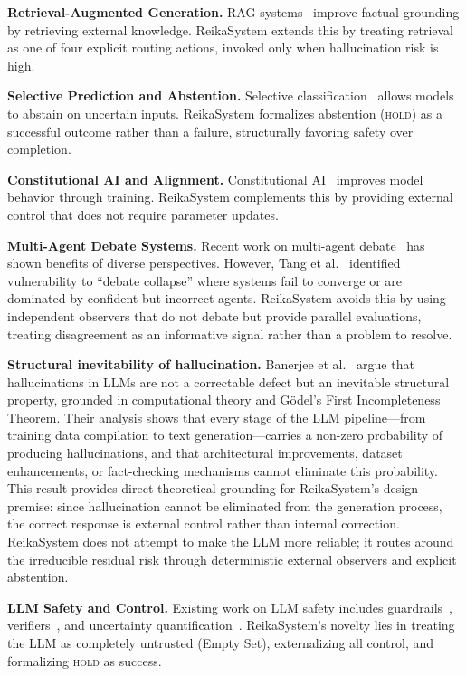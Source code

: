 \documentclass[11pt,a4paper]{article}
\begin{document}
\textbf{Retrieval-Augmented Generation.} RAG systems~\cite{lewis2020rag} improve factual
grounding by retrieving external knowledge. ReikaSystem extends this by treating retrieval as
one of four explicit routing actions, invoked only when hallucination risk is high.

\textbf{Selective Prediction and Abstention.} Selective classification~\cite{geifman2017selective}
allows models to abstain on uncertain inputs. ReikaSystem formalizes abstention (\textsc{hold})
as a successful outcome rather than a failure, structurally favoring safety over completion.

\textbf{Constitutional AI and Alignment.} Constitutional AI~\cite{bai2022constitutional}
improves model behavior through training. ReikaSystem complements this by providing external
control that does not require parameter updates.

\textbf{Multi-Agent Debate Systems.} Recent work on multi-agent
debate~\cite{du2023improving} has shown benefits of diverse perspectives. However,
Tang et al.~\cite{tang2024variance} identified vulnerability to ``debate collapse'' where
systems fail to converge or are dominated by confident but incorrect agents. ReikaSystem
avoids this by using independent observers that do not debate but provide parallel
evaluations, treating disagreement as an informative signal rather than a problem to resolve.

\textbf{Structural inevitability of hallucination.}
Banerjee et al.~\cite{banerjee2024hallucinate} argue that hallucinations in LLMs
are not a correctable defect but an inevitable structural property, grounded in
computational theory and G\"{o}del's First Incompleteness Theorem.
Their analysis shows that every stage of the LLM pipeline---from training data
compilation to text generation---carries a non-zero probability of producing
hallucinations, and that architectural improvements, dataset enhancements, or
fact-checking mechanisms cannot eliminate this probability.
This result provides direct theoretical grounding for ReikaSystem's design
premise: since hallucination cannot be eliminated from the generation process,
the correct response is external control rather than internal correction.
ReikaSystem does not attempt to make the LLM more reliable; it routes around
the irreducible residual risk through deterministic external observers and
explicit abstention.

\textbf{LLM Safety and Control.} Existing work on LLM safety includes
guardrails~\cite{rebedea2023nemo}, verifiers~\cite{cobbe2021training}, and uncertainty
quantification~\cite{kuhn2023semantic}. ReikaSystem's novelty lies in treating the LLM as
completely untrusted (Empty Set), externalizing all control, and formalizing \textsc{hold}
as success.
\end{document}
